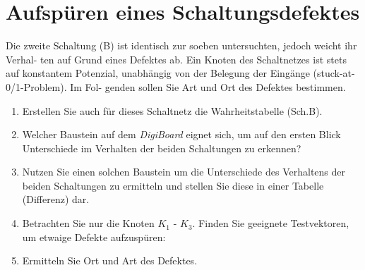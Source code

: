 \documentclass[10pt]{scrreprt}
\begin{document}
    \section{Aufspüren eines Schaltungsdefektes}
    Die zweite Schaltung (B) ist identisch zur soeben untersuchten, jedoch weicht ihr Verhal-
    ten auf Grund eines Defektes ab. Ein Knoten des Schaltnetzes ist stets auf konstantem
    Potenzial, unabhängig von der Belegung der Eingänge (stuck-at-0/1-Problem). Im Fol-
    genden sollen Sie Art und Ort des Defektes bestimmen.
    \begin{enumerate}
        \item Erstellen Sie auch für dieses Schaltnetz die Wahrheitstabelle (Sch.B).
        \item Welcher Baustein auf dem \textit{DigiBoard} eignet sich, um auf den ersten Blick
            Unterschiede im Verhalten der beiden Schaltungen zu erkennen?
        \item Nutzen Sie einen solchen Baustein um die Unterschiede des Verhaltens der beiden
            Schaltungen zu ermitteln und stellen Sie diese in einer Tabelle (Differenz) dar.
        \item Betrachten Sie nur die Knoten $K_1$ - $K_3$. Finden Sie geeignete Testvektoren, um
            etwaige Defekte aufzuspüren:
        \item Ermitteln Sie Ort und Art des Defektes.
    \end{enumerate}
\end{document}
